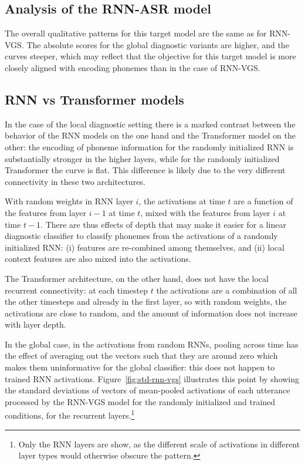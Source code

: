 \subsection{Analysis of the RNN-ASR model}
The overall qualitative patterns for this target model are the same as
for RNN-VGS. The absolute scores for the global diagnostic variants
are higher, and the curves steeper, which may reflect that the
objective for this target model is more closely aligned with encoding
phonemes than in the case of RNN-VGS.

\subsection{RNN vs Transformer models}
In the case of the local diagnostic setting there is a marked contrast
between the behavior of the RNN models on the one hand and the
Transformer model on the other: the encoding of phoneme information
for the randomly initialized RNN is substantially stronger in the
higher layers, while for the randomly initialized Transformer the
curve is flat. This difference is likely due to the very different
connectivity in these two architectures.

With random weights in
RNN layer $i$, the activations at time $t$ are a function of the
features from layer $i-1$ at time $t$, mixed with the features from
layer $i$ at time $t-1$. There are thus effects of depth that may make
it easier for a linear diagnostic classifier to classify phonemes from
the activations of a randomly initialized RNN: (i) features are
re-combined among themselves, and (ii) local context features are also
mixed into the activations.

The Transformer architecture, on the other hand, does not have the
local recurrent connectivity: at each timestep $t$ the activations are
a combination of all the other timesteps and already in the first
layer, so with random weights, the activations are close to random,
and the amount of information does not increase with layer depth.

In the global case, in the activations from random RNNs, pooling
across time has the effect of averaging out the vectors such that they
are around zero which makes them uninformative for the global
classifier: this does not happen to trained RNN
activations. Figure~\ref{fig:std-rnn-vgs} illustrates this point by
showing the standard deviations of vectors of mean-pooled activations
of each utterance processed by the RNN-VGS model for the randomly
initialized and trained conditions, for the recurrent
layers.\footnote{Only the RNN layers are show, as the different scale
  of activations in different layer types would otherwise obscure the
  pattern.}

